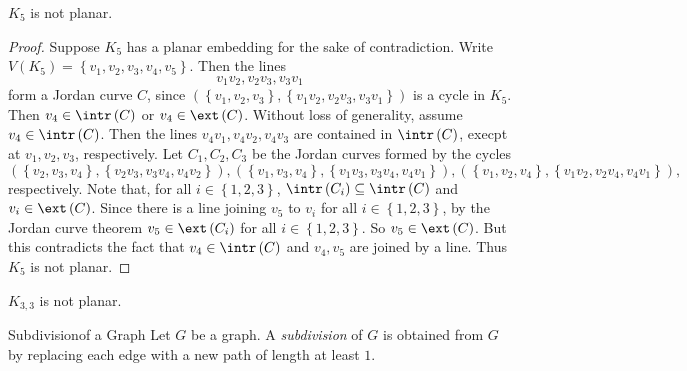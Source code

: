 \documentclass[co342]{subfiles}
\begin{document}
    \begin{cor}{}
        $K_5$ is not planar.
    \end{cor}

    \begin{proof}
        Suppose $K_5$ has a planar embedding for the sake of contradiction. Write $V\left( K_5 \right) = \left\lbrace v_1,v_2,v_3,v_4,v_5 \right\rbrace$. Then the lines
        \begin{equation*}
            v_1v_2,v_2v_3,v_3v_1
        \end{equation*}
        form a Jordan curve $C$, since $\left( \left\lbrace v_1,v_2,v_3 \right\rbrace, \left\lbrace v_1v_2,v_2v_3,v_3v_1 \right\rbrace \right)$ is a cycle in $K_5$. Then $v_4\in\intr\left( C \right)$ or $v_4\in\ext\left( C \right)$. Without loss of generality, assume $v_4\in\intr\left( C \right)$. Then the lines $v_4v_1,v_4v_2,v_4v_3$ are contained in $\intr\left( C \right)$, execpt at $v_1,v_2,v_3$, respectively. Let $C_1,C_2,C_3$ be the Jordan curves formed by the cycles
        \begin{equation*}
            \left( \left\lbrace v_2,v_3,v_4 \right\rbrace, \left\lbrace v_2v_3,v_3v_4,v_4v_2 \right\rbrace \right), \left( \left\lbrace v_1,v_3,v_4 \right\rbrace, \left\lbrace v_1v_3,v_3v_4,v_4v_1 \right\rbrace \right), \left( \left\lbrace v_1,v_2,v_4 \right\rbrace, \left\lbrace v_1v_2,v_2v_4,v_4v_1 \right\rbrace \right),
        \end{equation*}
        respectively. Note that, for all $i\in\left\lbrace 1,2,3 \right\rbrace$, $\intr\left( C_i \right)\subseteq\intr\left( C \right)$ and $v_i\in\ext\left( C \right)$. Since there is a line joining $v_5$ to $v_i$ for all $i\in\left\lbrace 1,2,3 \right\rbrace$, by the Jordan curve theorem $v_5\in\ext\left( C_i \right)$ for all $i\in\left\lbrace 1,2,3 \right\rbrace$. So $v_5\in\ext\left( C \right)$. But this contradicts the fact that $v_4\in\intr\left( C \right)$ and $v_4,v_5$ are joined by a line. Thus $K_5$ is not planar.
    \end{proof}

    \begin{cor}{}
        $K_{3,3}$ is not planar.
    \end{cor}

    \begin{definition}{Subdivision}{of a Graph}
        Let $G$ be a graph. A \emph{subdivision} of $G$ is obtained from $G$ by replacing each edge with a new path of length at least $1$.
    \end{definition}
    
\end{document}
